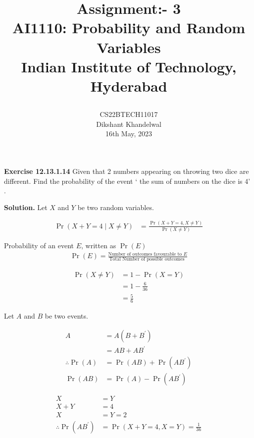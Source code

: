 \documentclass[journal,12pt,twocolumn]{IEEEtran}
\title{

  Assignment:- 3\\
  \Large AI1110: Probability and Random Variables\\
  \Large Indian Institute of Technology, Hyderabad
}
\author{
  CS22BTECH11017\\[4pt]
  Dikshant Khandelwal\\
  16th May, 2023
}
\providecommand{\pr}[1]{\ensuremath{\Pr\left(#1\right)}}
\theoremstyle{remark}
\providecommand{\cond}[2]{#1\middle|#2}
\begin{document}
%

\maketitle

\textbf{Exercise 12.13.1.14}
Given that 2 numbers appearing on throwing two dice are different. Find the probability of the event ‘ the sum of numbers on the dice is 4’ .

\textbf{Solution.} Let $X$ and $Y$ be two random variables.

\begin{table}[h]
    \label{table:0}
    
   \end{table}

\begin{align}
    \pr{\cond{X+Y = 4}{X \neq Y}} &= \frac{\pr{X+Y = 4,X \neq Y}}{\pr{X\neq Y}}
\end{align}

Probability of an event $E$, written as $\pr{E}$
\begin{align}
\pr{E}=\frac{\text{Number of outcomes favourable to $E$}}{\text{Total Number of possible outcomes }}
\end{align}

\begin{align}
    \pr{X\neq Y} &= 1 - \pr{X = Y}\\
    &= 1 - \frac{6}{36}\\
    &= \frac{5}{6}
\end{align}

Let $A$ and $B$ be two events.
\begin{table}[h]
  \label{table:1}
  
 \end{table}
\begin{align}
    A &= A(B + B^{\prime})\\
       &= AB + AB^{\prime}\\
       \therefore \pr{A} &= \pr{AB} + \pr{AB^{\prime}}\\
       \pr{AB}  &= \pr{A}-\pr{AB^{\prime}}
\end{align}



 
\begin{align}
 X &= Y\\
 X+Y &= 4\\
 X &= Y =2\\
  \therefore  \pr{AB^{\prime}} &= \pr{X+Y = 4,X = Y} = \frac{1}{36}
\end{align}
\end{document}
